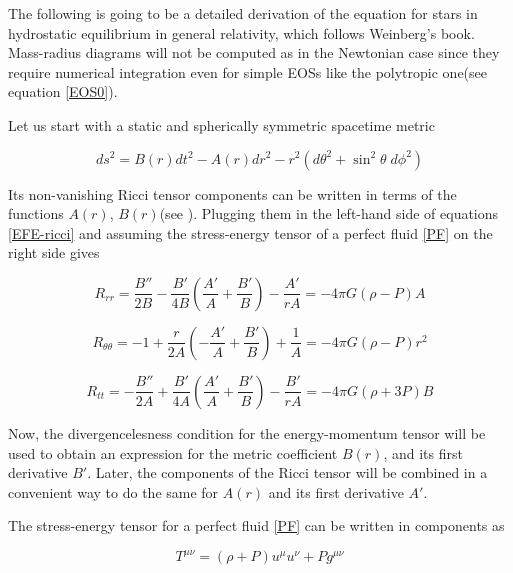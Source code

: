 The following is going to be a detailed derivation of the equation for stars in hydrostatic equilibrium in general relativity, which follows Weinberg's book\cite{Weinberg:1972kfs}. Mass-radius diagrams will not be computed as in the Newtonian case since they require numerical integration even for simple EOSs like the polytropic one(see equation \ref{EOS0}). 

Let us start with a static and spherically symmetric spacetime metric

\begin{equation}\label{metric}
ds^2 = B(r) dt^2 - A(r) dr^2 - r^2 (d\theta^2 + \sin^2 \theta \; d\phi^2)
\end{equation}

Its non-vanishing Ricci tensor components can be written in terms of the functions $A(r)$, $B(r)$(see \cite{Weinberg:1972kfs}). Plugging them in the left-hand side of equations \ref{EFE-ricci} and assuming the stress-energy tensor of a perfect fluid \ref{PF} on the right side gives

\begin{equation}\label{E1}
R_{rr} = \frac{B''}{2B} - \frac{B'}{4B} \left( \frac{A'}{A}+\frac{B'}{B} \right) - \frac{A'}{rA} = -4\pi G(\rho-P) A
\end{equation}

\begin{equation}\label{E2}
R_{\theta \theta}  = -1 + \frac{r}{2A} \left( -\frac{A'}{A} + \frac{B'}{B} \right) + \frac{1}{A} = -4\pi G(\rho - P) r^2
\end{equation}

\begin{equation}\label{E3}
R_{tt} = - \frac{B''}{2A} + \frac{B'}{4A} \left( \frac{A'}{A}+\frac{B'}{B} \right) - \frac{B'}{rA} = - 4\pi G (\rho + 3P) B
\end{equation}

Now, the divergencelesness condition for the energy-momentum tensor will be used to obtain an expression for the metric coefficient $B(r)$, and its first derivative $B'$. Later, the components of the Ricci tensor will be combined in a convenient way to do the same for $A(r)$ and its first derivative $A'$. 

The stress-energy tensor for a perfect fluid \ref{PF} can be written in components as

\begin{equation}
T^{\mu \nu} = (\rho + P) u^\mu u^\nu + P g^{\mu \nu}
\end{equation}

